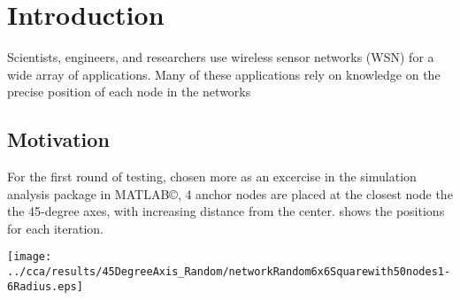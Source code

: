 \chapter{Introduction}

Scientists, engineers, and researchers use wireless sensor networks (WSN) for a
wide array of applications. Many of these applications rely on knowledge on the
precise position of each node in the networks


\section{Motivation} For the first round of testing, chosen more as an excercise
in the simulation analysis package in MATLAB\copyright, 4 anchor nodes are
placed at the closest node the the 45-degree axes, with increasing distance from
the center. shows the positions for each iteration.

\texttt{[image: ../cca/results/45DegreeAxis\_Random/networkRandom6x6Squarewith50nodes1-6Radius.eps]}\\
\label{fig:45DegreeAxisRandomNetwork} %

